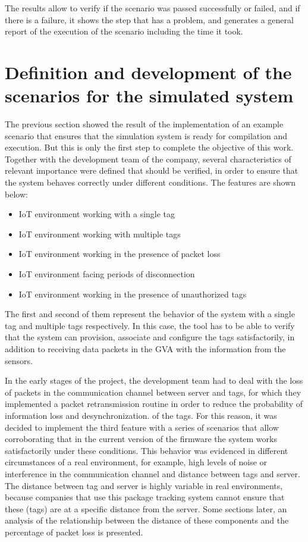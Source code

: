 \documentclass[journal]{IEEEtran}	%
\begin{document}
The results allow to verify if the scenario was passed successfully or failed, and if there is a failure, it shows the step that has a problem, and generates a general report of the execution of the scenario including the time it took.

\section{Definition and development of the scenarios for the simulated system}

The previous section showed the result of the implementation of an example scenario that ensures that the simulation system is ready for compilation and execution. But this is only the first step to complete the objective of this work. Together with the development team of the company, several characteristics of relevant importance were defined that should be verified, in order to ensure that the system behaves correctly under different conditions. The features are shown below:\\

\begin{itemize}
    \item IoT environment working with a single tag
    \item IoT environment working with multiple tags
    \item IoT environment working in the presence of packet loss
    \item IoT environment facing periods of disconnection
    \item IoT environment working in the presence of unauthorized tags
\end{itemize}

The first and second of them represent the behavior of the system with a single tag and multiple tags respectively. In this case, the tool has to be able to verify that the system can provision, associate and configure the tags satisfactorily, in addition to receiving data packets in the GVA with the information from the sensors.

In the early stages of the project, the development team had to deal with the loss of packets in the communication channel between server and tags, for which they implemented a packet retransmission routine in order to reduce the probability of information loss and desynchronization. of the tags. For this reason, it was decided to implement the third feature with a series of scenarios that allow corroborating that in the current version of the firmware the system works satisfactorily under these conditions. This behavior was evidenced in different circumstances of a real environment, for example, high levels of noise or interference in the communication channel and distance between tags and server. The distance between tag and server is highly variable in real environments, because companies that use this package tracking system cannot ensure that these (tags) are at a specific distance from the server. Some sections later, an analysis of the relationship between the distance of these components and the percentage of packet loss is presented.
\end{document}
